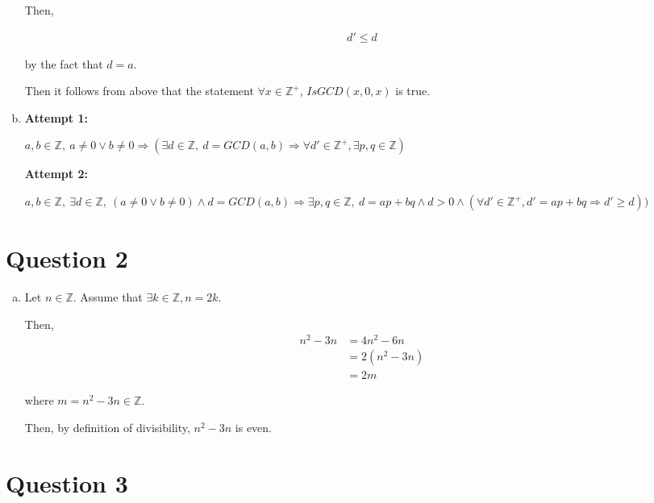\documentclass[12pt]{article}
\begin{document}
\begin{enumerate}[a.]
    \bigskip

    Then,

    \begin{align}
        d' \leq d
    \end{align}

    by the fact that $d = a$.

    \bigskip

    Then it follows from above that the statement $\forall x \in \mathbb{Z}^{+}$,
    $IsGCD(x,0,x)$ is true.

    \item

    \textbf{Attempt 1:}

    $a,b \in \mathbb{Z},\:a \neq 0 \lor b \neq 0 \Rightarrow (\exists d \in \mathbb{Z},
    \:d=GCD(a,b) \Rightarrow \forall d' \in \mathbb{Z}^{+}, \exists p,q \in \mathbb{Z})$

    \textbf{Attempt 2:}

    $a,b \in \mathbb{Z},\:\exists d \in \mathbb{Z},\:(a \neq 0 \lor b \neq 0)
    \land d=GCD(a,b) \Rightarrow \exists p,q \in \mathbb{Z},\:d = ap + bq \land
    d > 0 \land (\forall d' \in \mathbb{Z}^{+}, d' = ap + bq \Rightarrow d' \geq d))$

\end{enumerate}

\section*{Question 2}
\begin{enumerate}[a.]
    \item

    Let $n \in \mathbb{Z}$. Assume that $\exists k \in \mathbb{Z}, n = 2k$.

    \bigskip

    Then,
    \setcounter{equation}{0}
    \begin{align}
        n^2 - 3n &= 4n^2 - 6n\\
        &= 2(n^2 - 3n)\\
        &= 2m
    \end{align}

    where $m = n^2 - 3n \in \mathbb{Z}$.

    \bigskip

    Then, by definition of divisibility, $n^2 - 3n$ is even.
\end{enumerate}

\section*{Question 3}
\end{document}
